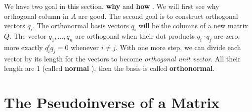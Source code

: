 We have two goal in this section, \textbf{why} and \textbf{how} . We will first see why orthogonal column in \(A\) are good. The second goal is to construct orthogonal vectors \(q_i\). The orthonormal basis vectors \(q_i\) will be the columns of a new matrix \(Q\). The vector \(q_1, \ldots, q_n\) are orthogonal when their dot products \(q_i \cdot q_j\) are zero, more exactly \(q^t_i q_j = 0\) whenever \(i \neq j\). With one more step, we can divide each vector by its length for the vectors to become \emph{orthogonal unit vector}. All their length are 1 (called \textbf{normal} ), then the basis is called \textbf{orthonormal}.          

\section{The Pseudoinverse of a Matrix}
